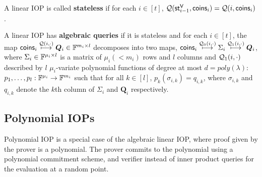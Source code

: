 \documentclass[runningheads]{llncs}
\def\verifier{\mathsf{V}}
\def\coins{\mathsf{coins}}
\begin{document}
A linear IOP is called \textbf{stateless} if for each $i\in [t]$, $\calQ(\st^{\verifier}_{i-1}, \coins_i) = \calQ(i,\coins_i)$.

A linear IOP has \textbf{algebraic queries} if it is stateless and for each $i\in[t]$, the map $\coins_i \stackrel{\calQ(i,\cdot)}{\longmapsto} \bm{Q}_i \in \bbF^{m_i \times l}$ decomposes into two maps, $\coins_i \stackrel{\calQ_0(i,\cdot)}{\longmapsto} \Sigma_i \stackrel{\calQ_1(i,\cdot)}{\longmapsto} \bm{Q}_i$, where $\Sigma_i \in \mathbb{F}^{\mu_i\times l}$ is a matrix of $\mu_i ( < m_i)$ rows and $l$ columns and $\mathcal{Q}_1(i,\cdot)$ described by $l$ $\mu_i$-variate polynomial functions of degree at most $d = poly(\lambda)$: $p_1,\ldots, p_l: \mathbb{F}^{\mu_i}\rightarrow \mathbb{F}^{m_i}$ such that for all $k\in[l]$, $p_k(\sigma_{i,k})=q_{i,k}$, where $\sigma_{i,k}$ and $q_{i,k}$ denote the $k$th column of $\Sigma_i$ and $\bm{Q}_i$ respectively.


\subsection{Polynomial IOPs}
Polynomial IOP is a special case of the algebraic linear IOP, where proof given by the prover is a polynomial. The prover commits to the polynomial using a polynomial commitment scheme, and verifier instead of inner product queries for the evaluation at a random point.
\end{document}
